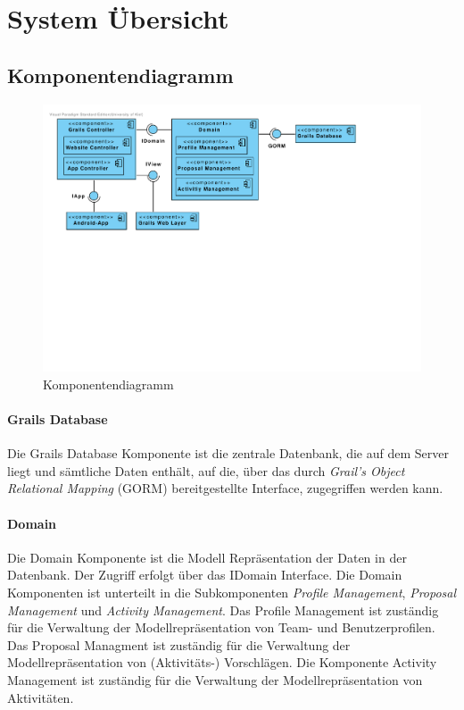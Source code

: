 \section{System \"Ubersicht}

\subsection{Komponentendiagramm}

\begin{figure}[H]
  \centering
  \includegraphics[width=\textwidth, trim=1cm 11cm 4cm 1cm, clip]{gfx/component_diagram}
  \caption{Komponentendiagramm}
\end{figure}

\paragraph{Grails Database} Die Grails Database Komponente ist die zentrale Datenbank, die auf dem Server liegt und s\"amtliche Daten enth\"alt, auf die, \"uber das durch \emph{Grail's Object Relational Mapping} (GORM) bereitgestellte Interface, zugegriffen werden kann.

\paragraph{Domain} Die Domain Komponente ist die Modell
Repr\"asentation der Daten in der Datenbank. Der Zugriff erfolgt
\"uber das IDomain Interface. Die Domain Komponenten ist unterteilt in
die Subkomponenten \emph{Profile Management}, \emph{Proposal
  Management} und \emph{Activity Management}. Das Profile Management
ist zuständig für die Verwaltung der Modellrepräsentation von Team-
und Benutzerprofilen. Das Proposal Managment ist zuständig für die
Verwaltung der Modellrepräsentation von (Aktivitäts-) Vorschlägen. Die
Komponente Activity Management ist zuständig für die Verwaltung der Modellrepräsentation von Aktivitäten.

